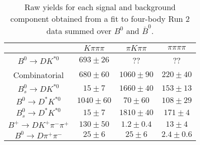 \begin{table}
  \centering
  \begin{tabular}{cccc}
      \toprule
       & $K\pi\pi\pi$ & $\pi K\pi\pi$ & $\pi\pi\pi\pi$ \\
      \midrule
      $B^0 \to DK^{*0}$ & $693 \pm 26$ & ?? & ?? \\
      Combinatorial & $680 \pm 60$ & $1060 \pm 90$ & $220 \pm 40$ \\
      $B^0_s \to DK^{*0}$ & $15 \pm 7$ & $1660 \pm 40$ & $153 \pm 13$ \\
      $B^0 \to D^*K^{*0}$ & $1040 \pm 60$ & $70 \pm 60$ & $108 \pm 29$ \\
      $B^0_s \to D^*K^{*0}$ & $15 \pm 7$ & $1810 \pm 40$ & $171 \pm 4$ \\
      $B^+ \to DK^+\pi^-\pi^+$ & $130 \pm 50$ & $1.2 \pm 0.4$ & $13 \pm 4$ \\
      $B^0 \to D\pi^+\pi^-$ & $25 \pm 6$ & $25 \pm 6$ & $2.4 \pm 0.6$ \\
      \bottomrule
      \end{tabular}
  \caption{Raw yields for each signal and background component obtained from a fit to four-body Run 2 data summed over $B^0$ and $\bar{B}^0$.}
\label{tab:yields_combined_4body_run2}
\end{table}

